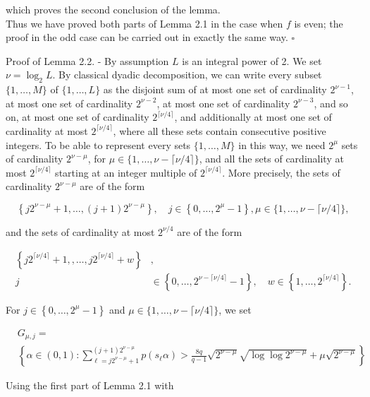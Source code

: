 \documentclass[10pt]{article}
\begin{document}
which proves the second conclusion of the lemma.\\
Thus we have proved both parts of Lemma 2.1 in the case when $f$ is even; the proof in the odd case can be carried out in exactly the same way. \(\square\)

Proof of Lemma 2.2. - By assumption $L$ is an integral power of 2. We set $\nu=\log _{2} L$. By classical dyadic decomposition, we can write every subset $\{1, \ldots, M\}$ of $\{1, \ldots, L\}$ as the disjoint sum of at most one set of cardinality $2^{\nu-1}$, at most one set of cardinality $2^{\nu-2}$, at most one set of cardinality $2^{\nu-3}$, and so on, at most one set of cardinality $2^{\lceil\nu / 4\rceil}$, and additionally at most one set of cardinality at most $2^{\lceil\nu / 4\rceil}$, where all these sets contain consecutive positive integers. To be able to represent every sets $\{1, \ldots, M\}$ in this way, we need $2^{\mu}$ sets of cardinality $2^{\nu-\mu}$, for $\mu \in\{1, \ldots, \nu-\lceil\nu / 4\rceil\}$, and all the sets of cardinality at most $2^{\lceil\nu / 4\rceil}$ starting at an integer multiple of $2^{\lceil\nu / 4\rceil}$. More precisely, the sets of cardinality $2^{\nu-\mu}$ are of the form

$$
\left\{j 2^{\nu-\mu}+1, \ldots,(j+1) 2^{\nu-\mu}\right\}, \quad j \in\left\{0, \ldots, 2^{\mu}-1\right\}, \mu \in\{1, \ldots, \nu-\lceil\nu / 4\rceil\},
$$

and the sets of cardinality at most $2^{\nu / 4}$ are of the form

$$
\begin{aligned}
\left\{j 2^{\lceil\nu / 4\rceil}+1,, \ldots, j 2^{\lceil\nu / 4\rceil}+w\right\} & , \\
j & \in\left\{0, \ldots, 2^{\nu-\lceil\nu / 4\rceil}-1\right\}, \quad w \in\left\{1, \ldots, 2^{\lceil\nu / 4\rceil}\right\} .
\end{aligned}
$$

For $j \in\left\{0, \ldots, 2^{\mu}-1\right\}$ and $\mu \in\{1, \ldots, \nu-\lceil\nu / 4\rceil\}$, we set

$$
\begin{aligned}
& G_{\mu, j}= \\
& \left\{\alpha \in(0,1): \sum_{\ell=j 2^{\nu-\mu}+1}^{(j+1) 2^{\nu-\mu}} p\left(s_{\ell} \alpha\right)>\frac{8 q}{q-1} \sqrt{2^{\nu-\mu}} \sqrt{\log \log 2^{\nu-\mu}}+\mu \sqrt{2^{\nu-\mu}}\right\}
\end{aligned}
$$

Using the first part of Lemma 2.1 with
\end{document}
